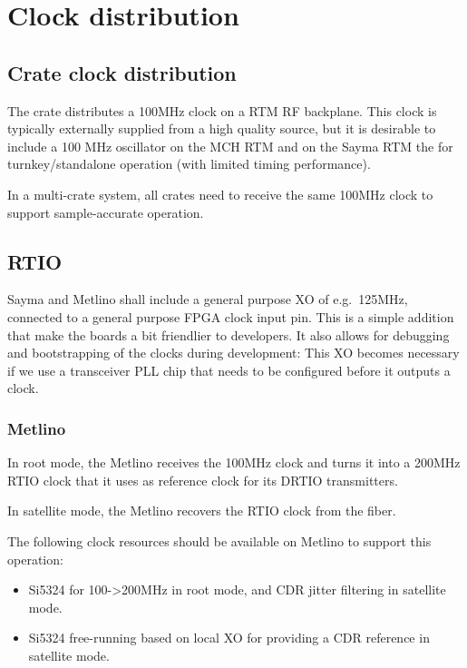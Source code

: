 \section{Clock distribution}

\subsection{Crate clock distribution}\label{crate-clock-distribution}

The crate distributes a 100MHz clock on a RTM RF backplane. This clock
is typically externally supplied from a high quality source, but it is
desirable to include a 100 MHz oscillator on the MCH RTM and on the
Sayma RTM the for turnkey/standalone operation (with limited timing
performance).

In a multi-crate system, all crates need to receive the same 100MHz
clock to support sample-accurate operation.

\subsection{RTIO}\label{rtio}

Sayma and Metlino shall include a general purpose XO of e.g.~125MHz,
connected to a general purpose FPGA clock input pin. This is a simple
addition that make the boards a bit friendlier to developers. It also
allows for debugging and bootstrapping of the clocks during development:
This XO becomes necessary if we use a transceiver PLL chip that needs to
be configured before it outputs a clock.

\subsubsection{Metlino}\label{metlino}

In root mode, the Metlino receives the 100MHz clock and turns it into a
200MHz RTIO clock that it uses as reference clock for its DRTIO
transmitters.

In satellite mode, the Metlino recovers the RTIO clock from the fiber.

The following clock resources should be available on Metlino to support
this operation:

\begin{itemize}

	\item
	Si5324 for 100-\textgreater{}200MHz in root mode, and CDR jitter
	filtering in satellite mode.
	\item
	Si5324 free-running based on local XO for providing a CDR reference in
	satellite mode.
\end{itemize}

